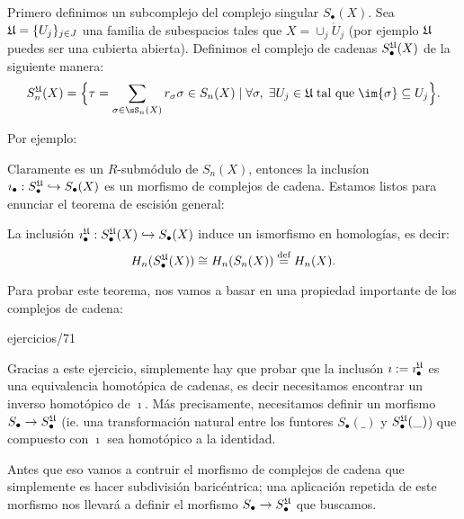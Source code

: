 \documentclass[../../topologia_algebraica]{subfiles}
\begin{document}
Primero definimos un subcomplejo del complejo singular $S_{\bullet}(X)$. Sea
$\mathfrak{U}=\{U_j\}_{j\in J}$ una familia de subespacios tales que $X=\cup_j \mathring{U}_j$
(por ejemplo $\mathfrak{U}$ puedes ser una cubierta abierta). Definimos el complejo de
cadenas $S_{\bullet}^{\mathfrak{U}}(X)$ de la siguiente manera:
\[
  S_n^{\fU}(X)=\Big\{\tau=\sum_{\sigma\in\sS_n(X)}r_{\sigma}\sigma\in S_n(X)\mid
  \forall\sigma,\;\exists U_j\in\fU\;\text{tal que}\;\im{\sigma}\subseteq U_j\Big\}.
\]

Por ejemplo:

\begin{figure}[h!]%
  \centering
\end{figure}%

Claramente es un $R$-subm\'odulo de $S_n(X)$, entonces la inclus\'ion
$\imath_{\bullet}:S_{\bullet}^{\mathfrak{U}}\hookrightarrow S_{\bullet}(X)$ es un morfismo de complejos
de cadena. Estamos listos para enunciar el teorema de escisi\'on general:

\begin{thm}\label{thm:escision_general}
  La inclusi\'on $\imath_{\bullet}^{\mathfrak{U}}:S_{\bullet}^{\mathfrak{U}}(X)\hookrightarrow S_{\bullet}(X)$
  induce un ismorfismo en homolog\'ias, es decir:
  \[
    H_n(S_{\bullet}^{\mathfrak{U}}(X))\cong H_n(S_n(X)) \stackrel{\text{def}}{=} H_n(X).
  \]
\end{thm}

Para probar este teorema, nos vamos a basar en una propiedad importante de los complejos
de cadena:

{ejercicios/71} %

Gracias a este ejercicio, simplemente hay que probar que la inclus\'on
$\imath:=\imath_{\bullet}^{\mathfrak{U}}$ es una equivalencia homot\'opica de cadenas, es decir
necesitamos encontrar un inverso homot\'opico de $\imath$. M\'as precisamente, necesitamos
definir un morfismo $S_{\bullet}\rightarrow S_{\bullet}^{\mathfrak{U}}$ (ie. una transformaci\'on natural
entre los funtores $S_{\bullet}(\_)$ y $S_{\bullet}^{\mathfrak{U}}(\_)$) que compuesto con $\imath$
sea homot\'opico a la identidad.

Antes que eso vamos a contruir el morfismo de complejos de cadena que simplemente es
hacer subdivisi\'on baric\'entrica; una aplicaci\'on repetida de este morfismo nos
llevar\'a a definir el morfismo $S_{\bullet}\rightarrow S_{\bullet}^{\mathfrak{U}}$ que buscamos.
\end{document}
